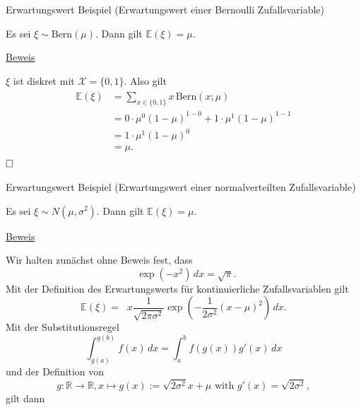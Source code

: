 \documentclass[
  8pt,
  ignorenonframetext,
]{beamer}
\DeclareMathOperator*{\intinf}{\int_{-\infty}^{\infty}}
\begin{document}
\begin{frame}{Erwartungswert}
\protect\hypertarget{erwartungswert-1}{}
Beispiel (Erwartungswert einer Bernoulli Zufallsvariable) \vspace{2mm}

\small

Es sei \(\xi \sim \mbox{Bern}(\mu)\). Dann gilt
\(\mathbb{E}(\xi) = \mu\). \vspace{5mm}

\underline{Beweis} \vspace{1mm}

\(\xi\) ist diskret mit \(\mathcal{X} = \{0,1\}\). Also gilt
\begin{align}
\begin{split}
\mathbb{E}(\xi)
& = \sum_{x \in \{0,1\}} x\,\mbox{Bern}(x;\mu) \\
& = 0\cdot \mu^0 (1 - \mu)^{1-0} + 1\cdot \mu^1 (1 - \mu)^{1-1} \\
& = 1\cdot \mu^1 (1 - \mu)^{0} \\
& = \mu.
\end{split}
\end{align} \(\hfill \Box\)
\end{frame}

\begin{frame}{Erwartungswert}
\protect\hypertarget{erwartungswert-2}{}
Beispiel (Erwartungswert einer normalverteilten Zufallsvariable)
\vspace{2mm}

\small

Es sei \(\xi \sim N(\mu,\sigma^2)\). Dann gilt
\(\mathbb{E}(\xi) = \mu\).

\vspace{2mm}

\footnotesize

\underline{Beweis} \vspace{1mm}

Wir halten zunächst ohne Beweis fest, dass \begin{equation}
\intinf \exp(-x^2)\,dx = \sqrt{\pi}.
\end{equation} Mit der Definition des Erwartungswerts für
kontinuierliche Zufallsvariablen gilt \begin{equation}
\mathbb{E}(\xi)
= \intinf x \frac{1}{\sqrt{2\pi\sigma^2}}\exp\left(-\frac{1}{2\sigma^2}(x - \mu)^2\right) \,dx.
\end{equation} Mit der Substitutionsregel \begin{equation}
\int_{g(a)}^{g(b)} f(x)\,dx = \int_a^b f(g(x))g'(x)\,dx
\end{equation} und der Definition von \begin{equation}
g : \mathbb{R} \to \mathbb{R}, x \mapsto g(x) := \sqrt{2\sigma^2}x + \mu
\mbox{ with } g'(x) = \sqrt{2\sigma^2},
\end{equation} gilt dann
\end{frame}
\end{document}
